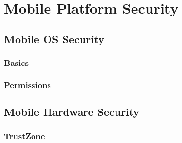 \section{Mobile Platform Security}
\subsection{Mobile OS Security}
\subsubsection{Basics}
\subsubsection{Permissions}
\subsection{Mobile Hardware Security}
\subsubsection{TrustZone}